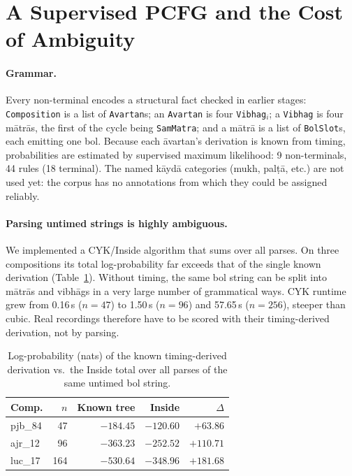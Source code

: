 \documentclass[11pt]{article}
\newcommand{\matra}{m\=atr\=a}
\newcommand{\avartan}{\=avartan}
\newcommand{\vibhag}{vibh\=ag}
\newcommand{\kayda}{k\=ayd\=a}
\begin{document}
\section{A Supervised PCFG and the Cost of Ambiguity}
\label{sec:pcfg}

\paragraph{Grammar.} Every non-terminal encodes a structural fact checked in
earlier stages: \texttt{Composition} is a list of \texttt{Avartan}s; an
\texttt{Avartan} is four \texttt{Vibhag}$_i$; a \texttt{Vibhag} is four
\matra{}s, the first of the cycle being \texttt{SamMatra}; and a \matra{} is a
list of \texttt{BolSlot}s, each emitting one bol. Because each \avartan{}'s
derivation is known from timing, probabilities are estimated by supervised
maximum likelihood: 9 non-terminals, 44 rules (18 terminal). The named
\kayda{} categories (mukh, pal\d{t}\=a, etc.) are not used yet: the
corpus has no annotations from which they could be assigned reliably.

\paragraph{Parsing untimed strings is highly ambiguous.} We implemented a
CYK/Inside algorithm that sums over all parses. On three compositions its
total log-probability far exceeds that of the single known derivation
(Table~\ref{tab:ambig}). Without timing, the same bol string can be split into
\matra{}s and \vibhag{}s in a very large number of grammatical ways. CYK
runtime grew from 0.16\,s ($n{=}47$) to 1.50\,s ($n{=}96$) and 57.65\,s
($n{=}256$), steeper than cubic. Real recordings therefore have to be scored
with their timing-derived derivation, not by parsing.

\begin{table}[t]
\centering\small
\begin{tabular}{lrrrr}
\toprule
Comp. & $n$ & Known tree & Inside & $\Delta$ \\
\midrule
pjb\_84 & 47 & $-184.45$ & $-120.60$ & $+63.86$ \\
ajr\_12 & 96 & $-363.23$ & $-252.52$ & $+110.71$ \\
luc\_17 & 164 & $-530.64$ & $-348.96$ & $+181.68$ \\
\bottomrule
\end{tabular}
\caption{Log-probability (nats) of the known timing-derived derivation vs.\
the Inside total over all parses of the same untimed bol string.}
\label{tab:ambig}
\end{table}
\end{document}
